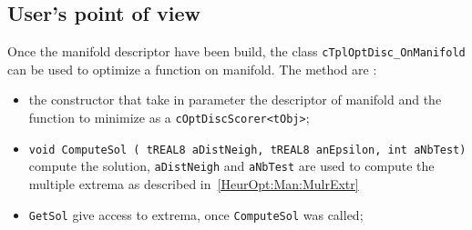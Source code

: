 
\subsection{User's point of view}

Once the manifold descriptor have been build, the class {\tt cTplOptDisc\_OnManifold}
can be used to optimize a function on manifold. The method are :

\begin{itemize}
   \item the constructor that take in parameter the descriptor of manifold and 
         the function to minimize as a {\tt cOptDiscScorer<tObj>};

   \item  {\tt void ComputeSol ( tREAL8 aDistNeigh, tREAL8 anEpsilon, int aNbTest)}
           compute the solution, {\tt aDistNeigh} and  {\tt aNbTest} are used to compute
          the multiple extrema as described in~\ref{HeurOpt:Man:MulrExtr}
   \item  {\tt GetSol} give access to extrema, once {\tt ComputeSol} was called;
\end{itemize}










